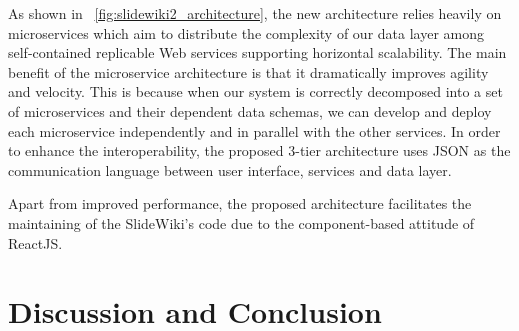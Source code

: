 \documentclass[ngerman,UKenglish,table]{scrbook}
\begin{document}
As shown in ~\autoref{fig:slidewiki2_architecture}, the new architecture relies heavily on microservices which aim to distribute the complexity of our data layer among self-contained replicable Web services supporting horizontal scalability.
The main benefit of the microservice architecture is that it dramatically improves agility and velocity.
This is because when our system is correctly decomposed into a set of microservices and their dependent data schemas, we can develop and deploy each microservice independently and in parallel with the other services.
In order to enhance the interoperability, the proposed 3-tier architecture uses JSON as the communication language between user interface, services and data layer.

Apart from improved performance, the proposed architecture facilitates the maintaining of the SlideWiki's code due to the component-based attitude of ReactJS.

%




 





\chapter{Discussion and Conclusion}
\label{chapter:conclusion}
\end{document}

